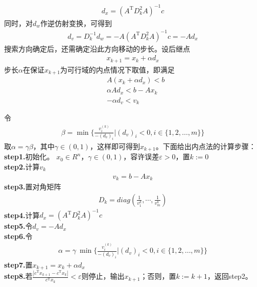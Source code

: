         \begin{align*}
         d_x=(A^\mathrm{T} D_k^2A)^{-1}c
        \end{align*}
        同时，对$d_w$作逆仿射变换，可得到
        \begin{align*}
         d_v=D_k^{-1}d_w=-A(A^\mathrm{T} D_k^2A)^{-1}c=-Ad_x
        \end{align*}
        搜索方向确定后，还需确定沿此方向移动的步长。设后继点
        \begin{align*}
         x_{k+1}=x_k+\alpha d_x
        \end{align*}
        步长$\alpha$在保证$x_{k+1}$为可行域的内点情况下取值，即满足
        \begin{align*}
        &A(x_k+\alpha d_x) < b\\
        &{\alpha}Ad_x < b-Ax_k\\
        &-\alpha d_v < v_k
        \end{align*}
        \par
        令
        \begin{align*}
        \beta = {\min}\bigg \{\frac{v_i^{(k)}}{-(d_v)_i}\bigg |(d_v)_i < 0,i \in\{1,2,\ldots,m\}\bigg\}
        \end{align*}
        取$\alpha=\gamma\beta$，其中$\gamma \in (0,1)$，这样即可得到$x_{k+1}$。下面给出内点法的计算步骤：\\
        \textbf{step1.}初始化。
        $x_0 \in R^n$，$\gamma \in (0,1)$，容许误差$\varepsilon > 0$，置$k:=0$\\
        \textbf{step2.}计算$v_k$
        \begin{align*}
        v_k=b-Ax_k
        \end{align*}
        \textbf{step3.}置对角矩阵\\
        \begin{align*}
        D_k = diag \left( \frac{1}{v_1^k},\cdots,\frac{1}{v_m^k} \right)
        \end{align*}
        \textbf{step4.}计算$d_x=(A^\mathrm{T} D_k^2A)^{-1}c$\\
        \textbf{step5.}令$d_v=-Ad_x$\\
        \textbf{step6.}令
        \begin{align*}
        \alpha = \gamma\ {\min}\bigg \{\frac{v_i^{(k)}}{-(d_v)_i}\bigg |(d_v)_i < 0,i \in\{1,2,\ldots,m\}\bigg\}
        \end{align*}
        \textbf{step7.}置$x_{k+1}=x_k+\alpha d_x$\\
        \textbf{step8.}若$\frac{|c^\mathrm{T} x_{k+1}-c^\mathrm{T} x_k|}{c^\mathrm{T} x_k} < \varepsilon$则停止，输出$x_{k+1}$；否则，置$k:=k+1$，返回step2。
